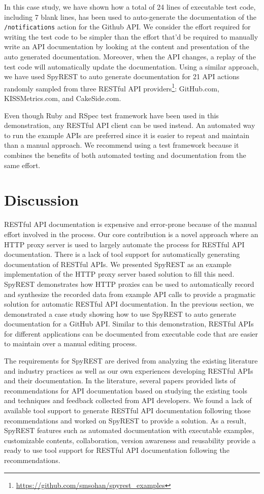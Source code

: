 \documentclass[conference]{IEEEtran}
\begin{document}
In this case study, we have shown how a total of 24 lines of executable test code, including 7 blank lines, has been used to auto-generate the documentation of the \texttt{/notifications} action for the Github API. We consider the effort required for writing the test code to be simpler than the effort that'd be required to manually write an API documentation by looking at the content and presentation of the auto generated documentation. Moreover, when the API changes, a replay of the test code will automatically update the documentation. Using a similar approach, we have used SpyREST to auto generate documentation for 21 API actions randomly sampled from three RESTful API providers\footnote{\url{https://github.com/smsohan/spyrest_examples}}: GitHub.com, KISSMetrics.com, and CakeSide.com.

Even though Ruby and RSpec test framework have been used in this demonstration, any RESTful API client can be used instead. An automated way to run the example APIs are preferred since it is easier to repeat and maintain than a manual approach. We recommend using a test framework because it combines the benefits of both automated testing and documentation from the same effort.

\section{Discussion}
RESTful API documentation is expensive and error-prone because of the manual effort involved in the process. Our core contribution is a novel approach where an HTTP proxy server is used to largely automate the process for RESTful API documentation. There is a lack of tool support for automatically generating documentation of RESTful APIs. We presented SpyREST as an example implementation of the HTTP proxy server based solution to fill this need. SpyREST demonstrates how HTTP proxies can be used to automatically record and synthesize the recorded data from example API calls to provide a pragmatic solution for automatic RESTful API documentation. In the previous section, we demonstrated a case study showing how to use SpyREST to auto generate documentation for a GitHub API. Similar to this demonstration, RESTful APIs for different applications can be documented from executable code that are easier to maintain over a manual editing process.

The requirements for SpyREST are derived from analyzing the existing literature and industry practices as well as our own experiences developing RESTful APIs and their documentation. In the literature, several papers provided lists of recommendations for API documentation based on studying the existing tools and techniques and feedback collected from API developers. We found a lack of available tool support to generate RESTful API documentation following those recommendations and worked on SpyREST to provide a solution. As a result, SpyREST features such as automated documentation with executable examples, customizable contents, collaboration, version awareness and reusability provide a ready to use tool support for RESTful API documentation following the recommendations.
\end{document}
